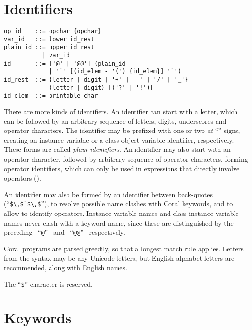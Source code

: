 \newpage






\section{Identifiers}
\label{sec:identifiers}

\syntax\begin{lstlisting}
op_id    ::= opchar {opchar}
var_id   ::= lower id_rest
plain_id ::= upper id_rest
           | var_id
id       ::= ['@' | '@@'] (plain_id
             | '`' [(id_elem - '(') {id_elem}] '`')
id_rest  ::= {letter | digit | '+' | '-' | '/' | '_'}
             (letter | digit) [('?' | '!')]
id_elem  ::= printable_char
\end{lstlisting}

There are more kinds of identifiers. An identifier can start with a letter, which can be followed by an arbitrary sequence of letters, digits, underscores and operator characters. The identifier may be prefixed with one or two {\em at} ``'' signs, creating an instance variable or a class object variable identifier, respectively. These forms are called {\em plain identifiers}. An identifier may also start with an operator character, followed by arbitrary sequence of operator characters, forming operator identifiers, which can only be used in expressions that directly involve operators (). 

An identifier may also be formed by an identifier between back-quotes (``\lstinline!$\,$`$\,$!''), to resolve possible name clashes with Coral keywords, and to allow to identify operators. Instance variable names and class instance variable names never clash with a keyword name, since these are distinguished by the preceding ~``\lstinline!@!''~ and ~``\lstinline!@@!''~ respectively. 

Coral programs are parsed greedily, so that a longest match rule applies. Letters from the syntax may be any Unicode letters, but English alphabet letters are recommended, along with English names.

The ``\lstinline[mathescape=false]!$!'' character is reserved. 






\section{Keywords}\label{sec:keywords}

